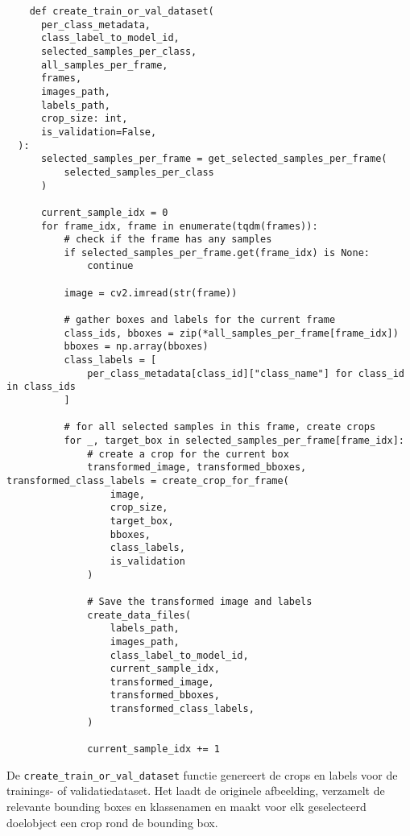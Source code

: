 \begin{listing}[H]
  \fontsize{11pt}{9.6pt}
  \begin{verbatim}
    def create_train_or_val_dataset(
      per_class_metadata,
      class_label_to_model_id,
      selected_samples_per_class,
      all_samples_per_frame,
      frames,
      images_path,
      labels_path,
      crop_size: int,
      is_validation=False,
  ):
      selected_samples_per_frame = get_selected_samples_per_frame(
          selected_samples_per_class
      )

      current_sample_idx = 0
      for frame_idx, frame in enumerate(tqdm(frames)):
          # check if the frame has any samples
          if selected_samples_per_frame.get(frame_idx) is None:
              continue

          image = cv2.imread(str(frame))

          # gather boxes and labels for the current frame
          class_ids, bboxes = zip(*all_samples_per_frame[frame_idx])
          bboxes = np.array(bboxes)
          class_labels = [
              per_class_metadata[class_id]["class_name"] for class_id in class_ids
          ]

          # for all selected samples in this frame, create crops
          for _, target_box in selected_samples_per_frame[frame_idx]:
              # create a crop for the current box
              transformed_image, transformed_bboxes, transformed_class_labels = create_crop_for_frame(
                  image,
                  crop_size,
                  target_box,
                  bboxes,
                  class_labels,
                  is_validation
              )

              # Save the transformed image and labels
              create_data_files(
                  labels_path,
                  images_path,
                  class_label_to_model_id,
                  current_sample_idx,
                  transformed_image,
                  transformed_bboxes,
                  transformed_class_labels,
              )

              current_sample_idx += 1
  \end{verbatim}
  \caption[Functie voor het creëren van de trainings- en validatiedatasets]{
    \label{listing:create-train-val-dataset}
    De \texttt{create\_train\_or\_val\_dataset} functie genereert de crops en labels voor de trainings- of validatiedataset.
    Het laadt de originele afbeelding, verzamelt de relevante bounding boxes en klassenamen 
    en maakt voor elk geselecteerd doelobject een crop rond de bounding box.
    }
\end{listing}

